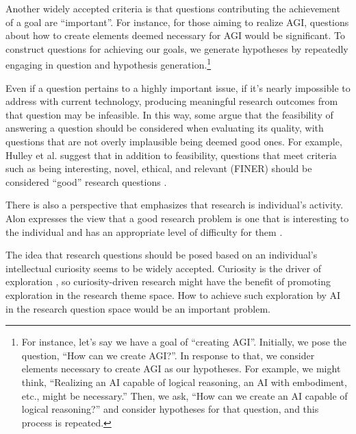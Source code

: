Another widely accepted criteria is that questions contributing the achievement of a goal are ``important''. For instance, for those aiming to realize AGI, questions about how to create elements deemed necessary for AGI would be significant. To construct questions for achieving our goals, we generate hypotheses by repeatedly engaging in question and hypothesis generation.\footnote{
For instance, let's say we have a goal of ``creating AGI''. Initially, we pose the question, ``How can we create AGI?''. In response to that, we consider elements necessary to create AGI as our hypotheses. For example, we might think, ``Realizing an AI capable of logical reasoning, an AI with embodiment, etc., might be necessary.'' Then, we ask, ``How can we create an AI capable of logical reasoning?'' and consider hypotheses for that question, and this process is repeated.
}

Even if a question pertains to a highly important issue, if it's nearly impossible to address with current technology, producing meaningful research outcomes from that question may be infeasible. In this way, some argue that the feasibility of answering a question should be considered when evaluating its quality, with questions that are not overly implausible being deemed good ones. For example, Hulley et al. suggest that in addition to feasibility, questions that meet criteria such as being interesting, novel, ethical, and relevant (FINER) should be considered ``good'' research questions \cite{hulley2007designing}.

There is also a perspective that emphasizes that research is  individual's activity. Alon expresses the view that a good research problem is one that is interesting to the individual and has an appropriate level of difficulty for them \cite{alon2009choose}.

The idea that research questions should be posed based on an individual's intellectual curiosity seems to be widely accepted. Curiosity is the driver of exploration \cite{oudeyer2018computational}, so curiosity-driven research might have the benefit of promoting exploration in the research theme space. How to achieve such exploration by AI in the research question space would be an important problem.




